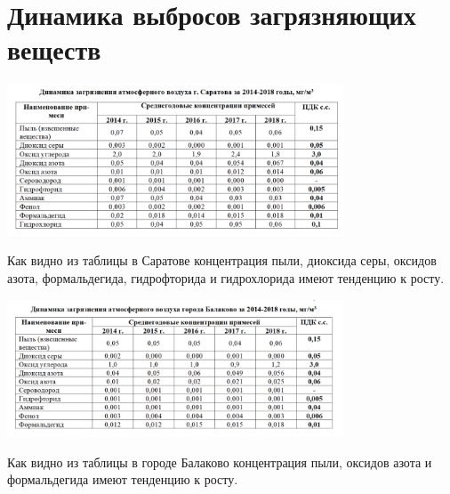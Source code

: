 
\section{Динамика выбросов загрязняющих веществ}
\begin{frame}{\insertsectionhead}
    \begin{center}
        \includegraphics[width=0.75\textwidth]{assets/tendations.png}
    \end{center}

    Как видно из таблицы в Саратове концентрация пыли, диоксида серы, оксидов азота,
    формальдегида, гидрофторида и гидрохлорида 
    имеют тенденцию к росту.
\end{frame}

\begin{frame}{\insertsectionhead}
    \begin{center}
        \includegraphics[width=0.75\textwidth]{assets/balakovo.png}
    \end{center}

    Как видно из таблицы в городе Балаково концентрация пыли, оксидов азота и
    формальдегида имеют тенденцию к росту.
\end{frame}

